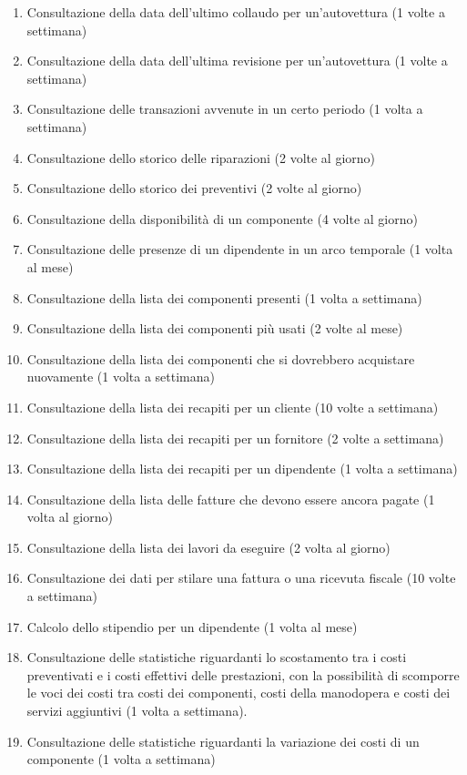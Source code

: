 \begin{enumerate}
			\item \label{op:show_collaudo}Consultazione della data dell’ultimo collaudo per un’autovettura (1 volte a settimana)
			\item \label{op:show_revisione}Consultazione della data dell’ultima revisione per un’autovettura (1 volte a settimana)
			\item \label{op:show_transazioni}Consultazione delle transazioni avvenute in un certo periodo (1 volta a settimana)
			\item \label{op:show_riparazioni}Consultazione dello storico delle riparazioni (2 volte al giorno)
			\item \label{op:show_preventivi}Consultazione dello storico dei preventivi (2 volte al giorno)
			\item \label{op:check_componente}Consultazione della disponibilità di un componente (4 volte al giorno)
			\item \label{op:check_turni}Consultazione delle presenze di un dipendente in un arco temporale (1 volta al mese)
			\item \label{op:list_componenti}Consultazione della lista dei componenti presenti (1 volta a settimana)
			\item \label{op:stats_componenti}Consultazione della lista dei componenti più usati (2 volte al mese)
			\item \label{op:tobuy_componenti}Consultazione della lista dei componenti che si dovrebbero acquistare nuovamente (1 volta a settimana)
			\item \label{op:show_recapiti_cliente}Consultazione della lista dei recapiti per un cliente (10 volte a settimana)
			\item \label{op:show_recapiti_fornitore}Consultazione della lista dei recapiti per un fornitore (2 volte a settimana)
			\item \label{op:show_recapiti_operatore}Consultazione della lista dei recapiti per un dipendente (1 volta a settimana)
			\item \label{op:list_fatture_pending}Consultazione della lista delle fatture che devono essere ancora pagate (1 volta al giorno)
			\item \label{op:todo_list}Consultazione della lista dei lavori da eseguire (2 volta al giorno)
			\item \label{op:show_fattura}Consultazione dei dati per stilare una fattura o una ricevuta fiscale (10 volte a settimana)
			\item \label{op:calc_stipendio_operatore}Calcolo dello stipendio per un dipendente (1 volta al mese)
			\item \label{op:stats_prevetivi_prestazioni}Consultazione delle statistiche riguardanti lo scostamento tra i costi preventivati e i costi effettivi delle prestazioni, con la possibilità di scomporre le voci dei costi tra costi dei componenti, costi della manodopera e costi dei servizi aggiuntivi (1 volta a settimana).
			\item \label{op:stats_costi}Consultazione delle statistiche riguardanti la variazione dei costi di un componente (1 volta a settimana)
			
		\end{enumerate}
